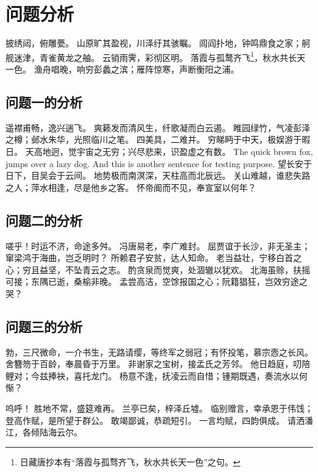 \section{问题分析}

披绣闼，俯雕甍。
山原旷其盈视，川泽纡其骇瞩。
闾阎扑地，钟鸣鼎食之家；舸舰迷津，青雀黄龙之舳。
云销雨霁，彩彻区明。
落霞与孤鹜齐飞\footnote{日藏唐抄本有“落霞与孤骛齐飞，秋水共长天一色”之句。}，秋水共长天一色。
渔舟唱晚，响穷彭蠡之滨；雁阵惊寒，声断衡阳之浦。

\subsection{问题一的分析}

遥襟甫畅，逸兴遄飞。
爽籁发而清风生，纤歌凝而白云遏。
睢园绿竹，气凌彭泽之樽；邺水朱华，光照临川之笔。
四美具，二难并。
穷睇眄于中天，极娱游于暇日。
天高地迥，觉宇宙之无穷；兴尽悲来，识盈虚之有数。
The quick brown fox, jumps over a lazy dog.
And this is another sentence for testing purpose.
望长安于日下，目吴会于云间。
地势极而南溟深，天柱高而北辰远。
关山难越，谁悲失路之人；萍水相逢，尽是他乡之客。
怀帝阍而不见，奉宣室以何年？

\subsection{问题二的分析}

嗟乎！时运不济，命途多舛。
冯唐易老，李广难封。
屈贾谊于长沙，非无圣主；窜梁鸿于海曲，岂乏明时？
所赖君子安贫，达人知命。
老当益壮，宁移白首之心；穷且益坚，不坠青云之志。
酌贪泉而觉爽，处涸辙以犹欢。
北海虽赊，扶摇可接；东隅已逝，桑榆非晚。
孟尝高洁，空馀报国之心；阮籍猖狂，岂效穷途之哭？ 

\subsection{问题三的分析}

勃，三尺微命，一介书生，无路请缨，等终军之弱冠；有怀投笔，慕宗悫之长风。
舍簪笏于百龄，奉晨昏于万里。
非谢家之宝树，接孟氏之芳邻。
他日趋庭，叨陪鲤对；今兹捧袂，喜托龙门。
杨意不逢，抚凌云而自惜；锺期既遇，奏流水以何惭？

呜呼！
胜地不常，盛筵难再。
兰亭已矣，梓泽丘墟。
临别赠言，幸承恩于伟饯；登高作赋，是所望于群公。
敢竭鄙诚，恭疏短引。
一言均赋，四韵俱成。
请洒潘江，各倾陆海云尔。